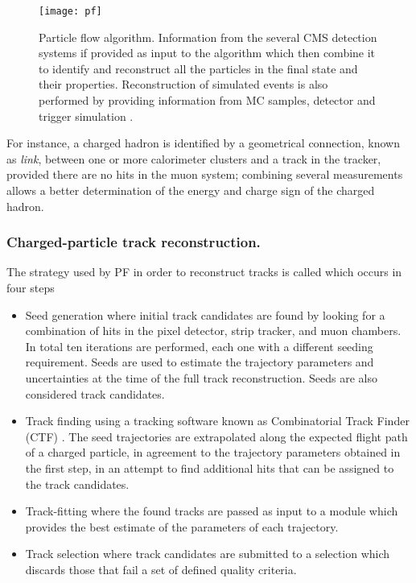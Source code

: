 \begin{figure}[!h]
  \centering
  \texttt{[image: pf]}
  \caption[Particle flow algorithm.]{Particle flow algorithm. Information from the several CMS detection systems if provided as input to the algorithm which then combine it to identify and reconstruct all the particles in the final state and their properties. Reconstruction of simulated events is also performed by providing information from MC samples, detector and trigger simulation \cite{pfdiag}.}\label{fig:pf}
\end{figure}

\noindent For instance, a charged hadron is identified by a geometrical connection, known as \textit{link}, between one or more calorimeter clusters and a track in the tracker, provided there are no hits in the muon system; combining several measurements allows a better determination of the energy and charge sign of the charged hadron.   


\subsubsection*{Charged-particle track reconstruction.}

\noindent The strategy used by PF in order to reconstruct tracks is called  which occurs in four steps

\begin{itemize}
\item Seed generation where initial track candidates are found by looking for a combination of hits in the pixel detector, strip tracker, and muon chambers. In total ten iterations are performed, each one with a different seeding requirement. Seeds are used to estimate the trajectory parameters and uncertainties at the time of the full track reconstruction. Seeds are also considered track candidates.    
\item Track finding using a tracking software known as Combinatorial Track Finder (CTF) \cite{ctf}. The seed trajectories are extrapolated along the expected flight path of a charged particle, in agreement to the trajectory parameters obtained in the first step, in an attempt to find additional hits that can be assigned to the track candidates. 
\item Track-fitting where the found tracks are passed as input to a module which provides the best estimate of the parameters of each trajectory.
\item Track selection where track candidates are submitted to a selection which discards those that fail a set of defined quality criteria.
\end{itemize}

